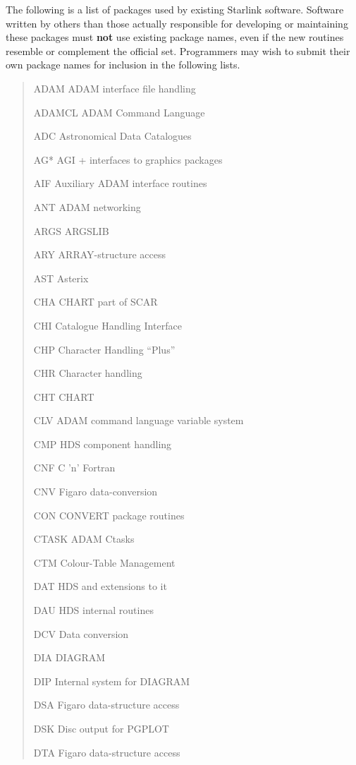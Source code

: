 \documentclass[twoside,11pt,nolof,noabs]{starlink}
\renewcommand{\_}{{\tt\char'137}}
\begin{document}
The following is a list of packages used by existing Starlink software.
Software written by others than those actually responsible for developing or
maintaining these packages must \textbf{not} use existing package names, even if
the new routines resemble or complement the official set.
Programmers may wish to submit their own package names for inclusion in the
following lists.
\begin{quote}
\begin{aligndesc}
\item[ADAM] ADAM interface file handling
\item[ADAMCL] ADAM Command Language
\item[ADC] Astronomical Data Catalogues
\item[AG*] AGI + interfaces to graphics packages
\item[AIF] Auxiliary ADAM interface routines
\item[ANT] ADAM networking
\item[ARGS] ARGSLIB
\item[ARY] ARRAY-structure access
\item[AST] Asterix
\item[CHA] CHART part of SCAR
\item[CHI] Catalogue Handling Interface
\item[CHP] Character Handling ``Plus''
\item[CHR] Character handling
\item[CHT] CHART
\item[CLV] ADAM command language variable system
\item[CMP] HDS component handling
\item[CNF] C 'n' Fortran
\item[CNV] Figaro data-conversion
\item[CON] CONVERT package routines
\item[CTASK] ADAM Ctasks
\item[CTM] Colour-Table Management
\item[DAT] HDS and extensions to it
\item[DAU] HDS internal routines
\item[DCV] Data conversion
\item[DIA] DIAGRAM
\item[DIP] Internal system for DIAGRAM
\item[DSA] Figaro data-structure access
\item[DSK] Disc output for PGPLOT
\item[DTA] Figaro data-structure access

\end{aligndesc}
\end{quote}
\end{document}
